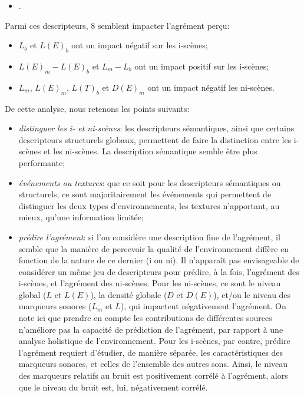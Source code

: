 \begin{itemize}
\item {}.
\end{itemize}

Parmi ces descripteurs, 8 semblent impacter l'agrément perçu: 

\begin{itemize}
\item $L_b$ et $L(E)_b$ ont un impact négatif sur les i-scènes;
\item $L(E)_m-L(E)_b$ et $L_m-L_b$ ont un impact positif sur les i-scènes;
\item $L_m$, $L(E)_m$, $L(T)_b$ et $D(E)_m$ ont un impact négatif les ni-scènes.
\end{itemize}

De cette analyse, nous retenons les points suivants:

\begin{itemize}
\item \emph{distinguer les i- et ni-scènes}: les descripteurs sémantiques, ainsi que certains descripteurs structurels globaux, permettent de faire la distinction entre les i-scènes et les ni-scènes. La description sémantique semble être plus performante;
\item \emph{événements ou textures}: que ce soit pour les descripteurs sémantiques ou structurels, ce sont majoritairement les événements qui permettent de distinguer les deux types d'environnements, les textures n'apportant, au mieux, qu'une information limitée;
\item \emph{prédire l'agrément}: si l'on considère une description fine de l'agrément, il semble que la manière de percevoir la qualité de l'environnement diffère en fonction de la nature de ce dernier (i ou ni). Il n'apparaît pas envisageable de considérer un même jeu de descripteurs pour prédire, à la fois, l'agrément des i-scènes, et l'agrément des ni-scènes. Pour les ni-scènes, ce sont le niveau global ($L$ et $L(E)$), la densité globale ($D$ et $D(E)$), et/ou le niveau des marqueurs sonores ($L_m$ et $L$), qui impactent négativement l'agrément. On note ici que prendre en compte les contributions de différentes sources n'améliore pas la capacité de prédiction de l'agrément, par rapport à une analyse holistique de l'environnement. Pour les i-scènes, par contre, prédire l'agrément requiert d'étudier, de manière séparée, les caractéristiques des marqueurs sonores, et celles de l'ensemble des autres sons. Ainsi, le niveau des marqueurs relatifs au bruit est positivement corrélé à l'agrément, alors que le niveau du bruit est, lui, négativement corrélé.  
\end{itemize}


